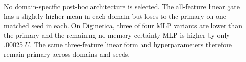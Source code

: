 \documentclass[runningheads]{llncs}
\begin{document}
\clearpage
\begin{table}[h]
\caption{Gate-capacity ablation, test $U$ mean (SD) over matched seeds.
``Primary'' is features 1--3, linear, bounded by .10.}
\centering\small
\setlength{\tabcolsep}{4pt}
\end{table}
No domain-specific post-hoc architecture is selected. The all-feature linear
gate has a slightly higher mean in each domain but loses to the primary on one
matched seed in each. On Diginetica, three of four MLP variants are lower than
the primary and the remaining no-memory-certainty MLP is higher by only .00025
$U$. The same
three-feature linear form and hyperparameters therefore remain primary across
domains and seeds.
\end{document}
